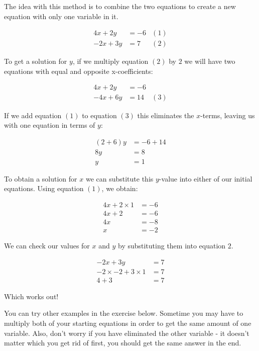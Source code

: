 \documentclass[
  a4paper,
]{scrbook}
\begin{document}
The idea with this method is to combine the two equations to create a
new equation with only one variable in it.

\[
\begin{aligned}
4x + 2y &= -6 &(1)\\
-2x + 3y &= 7 &(2)
\end{aligned}
\]

To get a solution for \(y\), if we multiply equation \((2)\) by \(2\) we
will have two equations with equal and opposite x-coefficients:

\[
\begin{aligned}
4x + 2y &= -6   \\
-4x + 6y &= 14 &(3)
\end{aligned}
\]

If we add equation \((1)\) to equation \((3)\) this eliminates the
\(x\)-terms, leaving us with one equation in terms of \(y\):

\[
\begin{aligned}
(2+6)y &= -6 + 14   \\
8y &= 8 \\
y &= 1
\end{aligned}
\]

To obtain a solution for \(x\) we can substitute this \(y\)-value into
either of our initial equations. Using equation \((1)\), we obtain:

\[
\begin{aligned}
4x + 2 \times 1 &= -6 \\
4x + 2 &= -6 \\
4x &= -8 \\
x &= -2
\end{aligned}
\]

We can check our values for \(x\) and \(y\) by substituting them into
equation \(2\).

\[
\begin{aligned}
-2x + 3y &= 7 \\
-2 \times -2 + 3 \times 1 &= 7 \\
4 + 3 &= 7
\end{aligned}
\]

Which works out!

You can try other examples in the exercise below. Sometime you may have
to multiply both of your starting equations in order to get the same
amount of one variable. Also, don't worry if you have eliminated the
other variable - it doesn't matter which you get rid of first, you
should get the same answer in the end.
\end{document}
